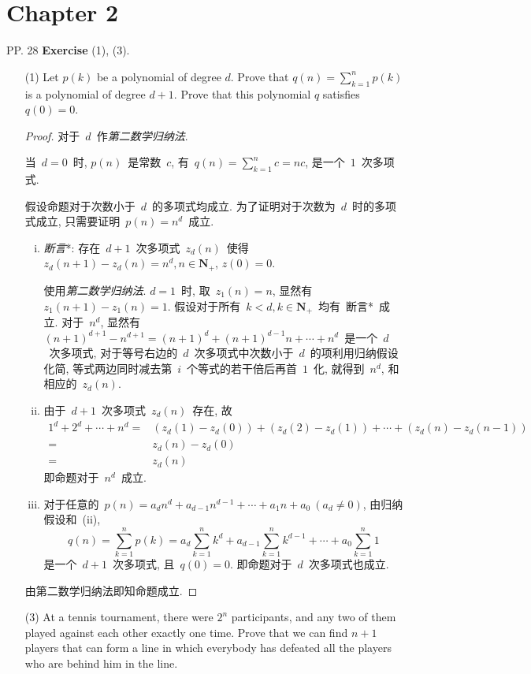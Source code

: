\documentclass[UTF8,a4paper,10pt]{article}
\begin{document}
\section*{Chapter 2}
PP. 28 {\bf Exercise} (1), (3).
\kaishu
\begin{enumerate}
	\item[(1)] Let $p(k)$ be a polynomial of degree $d$. Prove that $q(n) =\sum_{k=1}^n p(k)$ is a polynomial of degree $d + 1$. Prove that this polynomial $q$ satisfies $q(0) = 0$.
	      \begin{proof}
		      对于~$d$~作\emph{第二数学归纳法}.

		      当~$d=0$~时, $p(n)$~是常数~$c$, 有~$q(n)=\sum_{k=1}^n c=nc$, 是一个~$1$~次多项式.

		      假设命题对于次数小于~$d$~的多项式均成立. 为了证明对于次数为~$d$~时的多项式成立, 只需要证明~$p(n)=n^d$~成立.
		      \begin{enumerate}[(i)]
			      \item \emph{断言}*: 存在~$d+1$~次多项式~$z_d(n)$~使得~$z_d(n+1)-z_d(n)=n^d, n\in\mathbf{N}_{+}$, $z(0)=0$.

			            使用\emph{第二数学归纳法}. $d=1$~时, 取~$z_1(n)=n$, 显然有~$z_1(n+1)-z_1(n)=1$. 假设对于所有~$k<d, k\in\mathbf{N}_{+}$~均有~断言*~成立. 对于~$n^d$, 显然有~$(n+1)^{d+1}-n^{d+1}=(n+1)^d+(n+1)^{d-1}n+\cdots+n^d$~是一个~$d$~次多项式, 对于等号右边的~$d$~次多项式中次数小于~$d$~的项利用归纳假设化简, 等式两边同时减去第~$i$~个等式的若干倍后再首~$1$~化, 就得到~$n^d$, 和相应的~$z_d(n)$.
			      \item 由于~$d+1$~次多项式~$z_d(n)$~存在, 故
			            \[
				            \begin{split}
					            1^d+2^d+\cdots+n^d=&(z_d(1)-z_d(0))+(z_d(2)-z_d(1))+\cdots+(z_d(n)-z_d(n-1))\\
					            =&z_d(n)-z_d(0)\\
					            =&z_d(n)
				            \end{split}
			            \]
			            即命题对于~$n^d$~成立.
			      \item 对于任意的~$p(n)=a_dn^d+a_{d-1}n^{d-1}+\cdots+a_1n+a_0\ (a_d\neq 0)$, 由归纳假设和~(ii),
			            \[
				            q(n)=\sum_{k=1}^n p(k)=a_d\sum_{k=1}^n k^d + a_{d-1}\sum_{k=1}^n k^{d-1}+\cdots+a_0\sum_{k=1}^n 1
			            \]
			            是一个~$d+1$~次多项式, 且~$q(0)=0$. 即命题对于~$d$~次多项式也成立.
		      \end{enumerate}
		      由第二数学归纳法即知命题成立.
	      \end{proof}
	\item[(3)] At a tennis tournament, there were $2^n$ participants, and any two of them played against each other exactly one time. Prove that we can find $n+1$ players that can form a line in which everybody has defeated all the players who are behind him in the line.


\end{enumerate}
\end{document}
